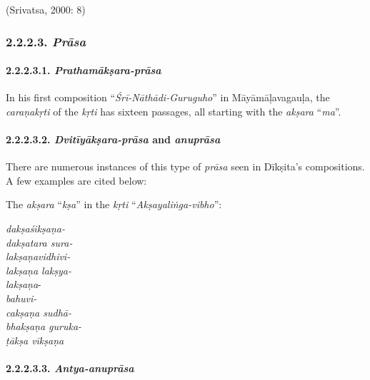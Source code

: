 \begin{flushright}
(Srivatsa, 2000: 8)
\end{flushright}


\subsubsection*{2.2.2.3. \textit{Prāsa}}

\paragraph*{2.2.2.3.1. \textit{Prathamākṣara-prāsa}}

In his first composition ``\textit{Śrī-Nāthādi-Guruguho}'' in Māyāmāḷavagauḷa, the \textit{caraṇa}\textit{kṛti} of the \textit{kṛti} has sixteen passages, all starting with the \textit{akṣara} ``\textit{ma}''.


\paragraph*{2.2.2.3.2. \textit{Dvitīyākṣara-prāsa} and \textit{anuprāsa}}

There are numerous instances of this type of \textit{prāsa} seen in Dīkṣita’s compositions. A few examples are cited below:

The \textit{akṣara} “\textit{kṣa}” in the \textit{kṛti} “\textit{Akṣayaliṅga-vibho}”:

\begin{myquote}
\textit{dakṣaśikṣaṇa-}\\ \textit{dakṣatara sura-}\\ \textit{lakṣaṇavidhivi-}\\ \textit{lakṣaṇa lakṣya-}\\ \textit{lakṣaṇa}-\\ \textit{bahuvi-}\\ \textit{cakṣaṇa sudhā-}\\ \textit{bhakṣaṇa guruka-}\\ \textit{ṭākṣa vīkṣaṇa}
\end{myquote}


\paragraph*{2.2.2.3.3. \textit{Antya-anuprāsa}}

